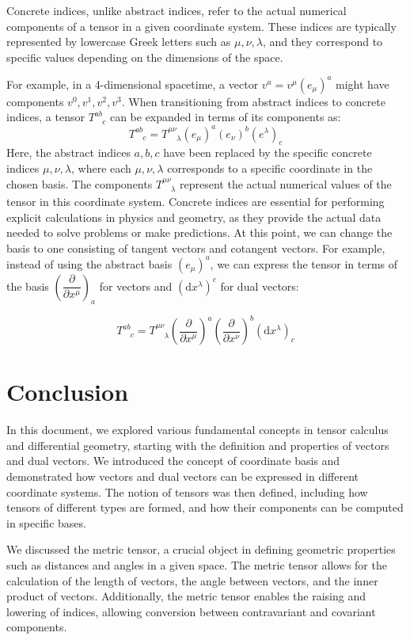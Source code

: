 \documentclass{article}
\begin{document}
Concrete indices, unlike abstract indices, refer to the actual numerical components of a tensor in a given coordinate system. These indices are typically represented by lowercase Greek letters such as \( \mu, \nu, \lambda \), and they correspond to specific values depending on the dimensions of the space.

For example, in a 4-dimensional spacetime, a vector \( v^a=v^\mu(e_\mu)^a \) might have components \( v^0, v^1, v^2, v^3 \).
When transitioning from abstract indices to concrete indices, a tensor \( T^{ab}_{\phantom{ab}c} \) can be expanded in terms of its components as:
\[T^{ab}_{\phantom{ab}c} = T^{\mu\nu}_{\phantom{\mu\nu}\lambda} (e_\mu)^a (e_\nu)^b (e^\lambda)_c
\]
Here, the abstract indices \( a, b, c \) have been replaced by the specific concrete indices \( \mu, \nu, \lambda \), where each \( \mu, \nu, \lambda \) corresponds to a specific coordinate in the chosen basis. The components \( T^{\mu\nu}_{\phantom{\mu\nu}\lambda} \) represent the actual numerical values of the tensor in this coordinate system.
Concrete indices are essential for performing explicit calculations in physics and geometry, as they provide the actual data needed to solve problems or make predictions.
At this point, we can change the basis to one consisting of tangent vectors and cotangent vectors. For example, instead of using the abstract basis \( (e_\mu)^a \), we can express the tensor in terms of the basis \( \left(\dfrac{\partial}{\partial x^\mu}\right)_a \) for  vectors and \( (\mathrm{d}x^\lambda)^c \) for dual vectors:

\[
T^{ab}_{\phantom{ab}c} = T^{\mu\nu}_{\phantom{\mu\nu}\lambda} \left(\frac{\partial}{\partial x^\mu}\right)^a \left(\frac{\partial}{\partial x^\nu}\right)^b (\mathrm{d}x^\lambda)_c
\]
\section{Conclusion}

In this document, we explored various fundamental concepts in tensor calculus and differential geometry, starting with the definition and properties of vectors and dual vectors. We introduced the concept of coordinate basis and demonstrated how vectors and dual vectors can be expressed in different coordinate systems. The notion of tensors was then defined, including how tensors of different types are formed, and how their components can be computed in specific bases.

We discussed the metric tensor, a crucial object in defining geometric properties such as distances and angles in a given space. The metric tensor allows for the calculation of the length of vectors, the angle between vectors, and the inner product of vectors. Additionally, the metric tensor enables the raising and lowering of indices, allowing conversion between contravariant and covariant components.
\end{document}

